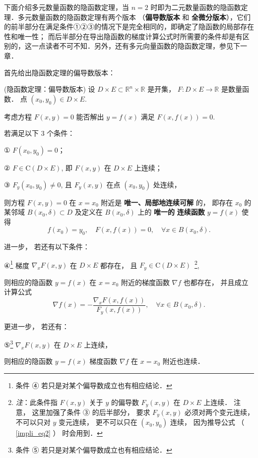 下面介绍多元数量函数的隐函数定理，当 $n=2$ 时即为二元数量函数的隐函数定理．多元数量函数的隐函数定理有两个版本 （\textbf{偏导数版本} 和\textbf{ 全微分版本}），它们的前半部分在满足条件①②③的情况下是完全相同的，即确定了隐函数的局部存在性和唯一性； 而后半部分在导出隐函数的梯度计算公式时所需要的条件却是有区别的，这一点读者不可不知．另外，还有多元向量函数的隐函数定理，参见下一章．

首先给出隐函数定理的偏导数版本：

 \begin{theorem}{(隐函数定理：偏导数版本)}\label{impli_the2}
 设 $D\times E\subset\mathbb{R}^{n}\times\mathbb{R}$ 是开集， $F:D\times E\rightarrow\mathbb{R}$
是数量函数． 点 $(x_{0},y_{0})\in D\times E.$ 

考虑方程 $F(x,y)=0$ 能否解出 $y=f(x)$ 满足 $F(x,f(x))=0.$ 

若满足以下 3 个条件：

① $F(x_{0},y_{0})=0$；

② $F\in\mathrm{C}(D\times E)$, 即 $F(x,y)$ 在 $D\times E$ 上连续； 

③ $F_{y}(x_{0},y_{0})\neq0$, 且 $F_{y}(x,y)$ 在点 $(x_0,y_0)$ 处连续，

则方程 $F(x,y)=0$ 在 $x=x_{0}$ 附近是\textbf{ 唯一、局部地连续可解} 的， 即存在 $x_{0}$
的某邻域 $B(x_{0},\delta)\subset D$ 及定义在 $B(x_{0},\delta)$ 上的 \textbf{唯一的} \textbf{
连续函数} $y=f(x)$ 使得
\[
f(x_{0})=y_{0},\quad F(x,f(x))=0,\quad\forall x\in B(x_{0},\delta).
\]

进一步， 若还有以下条件：

④\footnote{条件 ④ 若只是对某个偏导数成立也有相应结论． } 梯度 $\nabla_{x}F(x,y)$ 在 $D\times E$
都存在， 且 $F_y\in\mathrm{C}(D\times E)$ $\,$\footnote{\textsl{注}：此条件指 $F(x,y)$ 关于 $y$ 的偏导数 $F_{y}(x,y)$
 在 $D\times E$ 上连续． 注意， 这里加强了条件 ③ 的后半部分， 要求 $F_{y}(x,y)$ 必须对两个变元连续， 不可以只对 $y$
 变元连续， 更不可以只在 $(x_0,y_0)$ 连续， 因为推导公式 （ \autoref{impli_eq2} ） 时会用到．},

则相应的隐函数 $y=f(x)$ 在 $x=x_{0}$ 附近的梯度函数 $\nabla f$ 也都存在， 并且成立计算公式
\[
\nabla f(x)=-{\displaystyle \frac{\nabla_{x}F(x,f(x))}{F_{y}(x,f(x))}},\quad\forall x\in B(x_{0},\delta).
\]

更进一步， 若还有：

⑤\footnote{条件 ⑤ 若只是对某个偏导数成立也有相应结论．} $\nabla_{x}F(x,y)$ 在 $D\times E$
上连续， 

则相应的隐函数 $y=f(x)$ 梯度函数 $\nabla f$ 在 $x=x_{0}$ 附近也连续．


\end{theorem}

